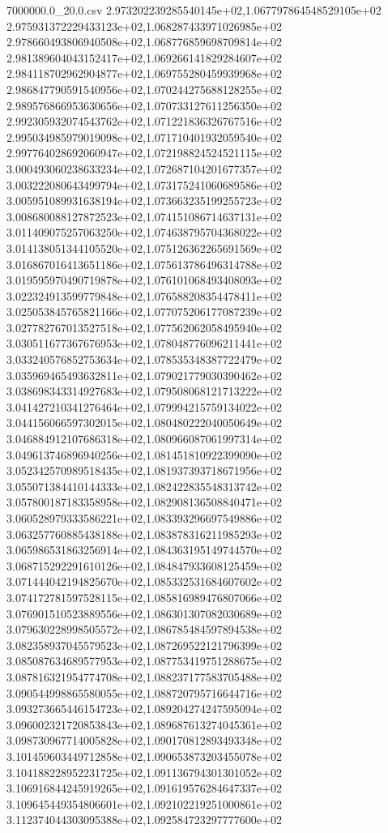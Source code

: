 \begin{filecontents*}{7000000.0_20.0.csv}
2.973202239285540145e+02,1.067797864548529105e+02
2.975931372229433123e+02,1.068287433971026985e+02
2.978660493806940508e+02,1.068776859698709814e+02
2.981389604043152417e+02,1.069266141829284607e+02
2.984118702962904877e+02,1.069755280459939968e+02
2.986847790591540956e+02,1.070244275688128255e+02
2.989576866953630656e+02,1.070733127611256350e+02
2.992305932074543762e+02,1.071221836326767516e+02
2.995034985979019098e+02,1.071710401932059540e+02
2.997764028692060947e+02,1.072198824524521115e+02
3.000493060238633234e+02,1.072687104201677357e+02
3.003222080643499794e+02,1.073175241060689586e+02
3.005951089931638194e+02,1.073663235199255723e+02
3.008680088127872523e+02,1.074151086714637131e+02
3.011409075257063250e+02,1.074638795704368022e+02
3.014138051344105520e+02,1.075126362265691569e+02
3.016867016413651186e+02,1.075613786496314788e+02
3.019595970490719878e+02,1.076101068493408093e+02
3.022324913599779848e+02,1.076588208354478411e+02
3.025053845765821166e+02,1.077075206177087239e+02
3.027782767013527518e+02,1.077562062058495940e+02
3.030511677367676953e+02,1.078048776096211441e+02
3.033240576852753634e+02,1.078535348387722479e+02
3.035969465493632811e+02,1.079021779030390462e+02
3.038698343314927683e+02,1.079508068121713222e+02
3.041427210341276464e+02,1.079994215759134022e+02
3.044156066597302015e+02,1.080480222040050649e+02
3.046884912107686318e+02,1.080966087061997314e+02
3.049613746896940256e+02,1.081451810922399090e+02
3.052342570989518435e+02,1.081937393718671956e+02
3.055071384410144333e+02,1.082422835548313742e+02
3.057800187183358958e+02,1.082908136508840471e+02
3.060528979333586221e+02,1.083393296697549886e+02
3.063257760885438188e+02,1.083878316211985293e+02
3.065986531863256914e+02,1.084363195149744570e+02
3.068715292291610126e+02,1.084847933608125459e+02
3.071444042194825670e+02,1.085332531684607602e+02
3.074172781597528115e+02,1.085816989476807066e+02
3.076901510523889556e+02,1.086301307082030689e+02
3.079630228998505572e+02,1.086785484597894538e+02
3.082358937045579523e+02,1.087269522121796399e+02
3.085087634689577953e+02,1.087753419751288675e+02
3.087816321954774708e+02,1.088237177583705488e+02
3.090544998865580055e+02,1.088720795716644716e+02
3.093273665446154723e+02,1.089204274247595094e+02
3.096002321720853843e+02,1.089687613274045361e+02
3.098730967714005828e+02,1.090170812893493348e+02
3.101459603449712858e+02,1.090653873203455078e+02
3.104188228952231725e+02,1.091136794301301052e+02
3.106916844245919265e+02,1.091619576284647337e+02
3.109645449354806601e+02,1.092102219251000861e+02
3.112374044303095388e+02,1.092584723297777600e+02

\end{filecontents*}
